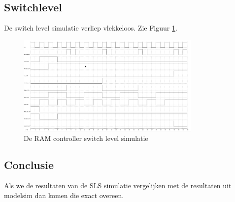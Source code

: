 \documentclass{scrreprt} %
\begin{document}
\subsection{Switchlevel}
De switch level simulatie verliep vlekkeloos. Zie Figuur \ref{fig:ramcontroller-sl-sim}.
\begin{figure}[H]
\centering
	\includegraphics[width=0.8\textwidth]{resources/wave_sls.png}
	\caption{De RAM controller switch level simulatie}
	\label{fig:ramcontroller-sl-sim}
\end{figure}

\subsection{Conclusie}
Als we de resultaten van de SLS simulatie vergelijken met de resultaten uit modelsim dan komen die exact overeen.
\end{document}
